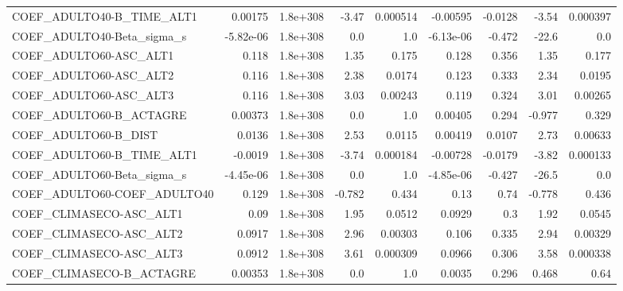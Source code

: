 \begin{tabular}{lrrrrrrrr}
COEF\_ADULTO40-B\_TIME\_ALT1         &     0.00175 &     1.8e+308 &   -3.47 & 0.000514 &   -0.00595 &     -0.0128 &        -3.54 &      0.000397 \\
COEF\_ADULTO40-Beta\_sigma\_s        &   -5.82e-06 &     1.8e+308 &     0.0 &      1.0 &  -6.13e-06 &      -0.472 &        -22.6 &           0.0 \\
COEF\_ADULTO60-ASC\_ALT1            &       0.118 &     1.8e+308 &    1.35 &    0.175 &      0.128 &       0.356 &         1.35 &         0.177 \\
COEF\_ADULTO60-ASC\_ALT2            &       0.116 &     1.8e+308 &    2.38 &   0.0174 &      0.123 &       0.333 &         2.34 &        0.0195 \\
COEF\_ADULTO60-ASC\_ALT3            &       0.116 &     1.8e+308 &    3.03 &  0.00243 &      0.119 &       0.324 &         3.01 &       0.00265 \\
COEF\_ADULTO60-B\_ACTAGRE           &     0.00373 &     1.8e+308 &     0.0 &      1.0 &    0.00405 &       0.294 &       -0.977 &         0.329 \\
COEF\_ADULTO60-B\_DIST              &      0.0136 &     1.8e+308 &    2.53 &   0.0115 &    0.00419 &      0.0107 &         2.73 &       0.00633 \\
COEF\_ADULTO60-B\_TIME\_ALT1         &     -0.0019 &     1.8e+308 &   -3.74 & 0.000184 &   -0.00728 &     -0.0179 &        -3.82 &      0.000133 \\
COEF\_ADULTO60-Beta\_sigma\_s        &   -4.45e-06 &     1.8e+308 &     0.0 &      1.0 &  -4.85e-06 &      -0.427 &        -26.5 &           0.0 \\
COEF\_ADULTO60-COEF\_ADULTO40       &       0.129 &     1.8e+308 &  -0.782 &    0.434 &       0.13 &        0.74 &       -0.778 &         0.436 \\
COEF\_CLIMASECO-ASC\_ALT1           &        0.09 &     1.8e+308 &    1.95 &   0.0512 &     0.0929 &         0.3 &         1.92 &        0.0545 \\
COEF\_CLIMASECO-ASC\_ALT2           &      0.0917 &     1.8e+308 &    2.96 &  0.00303 &      0.106 &       0.335 &         2.94 &       0.00329 \\
COEF\_CLIMASECO-ASC\_ALT3           &      0.0912 &     1.8e+308 &    3.61 & 0.000309 &     0.0966 &       0.306 &         3.58 &      0.000338 \\
COEF\_CLIMASECO-B\_ACTAGRE          &     0.00353 &     1.8e+308 &     0.0 &      1.0 &     0.0035 &       0.296 &        0.468 &          0.64 \\

\end{tabular}
